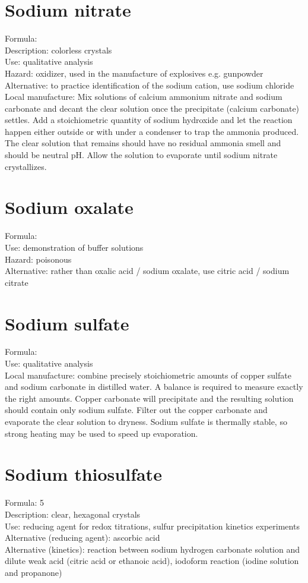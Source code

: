 \section{Sodium nitrate}
Formula: \\
Description: colorless crystals\\
Use: qualitative analysis\\
Hazard: oxidizer, 
used in the manufacture of explosives e.g. 
gunpowder\\
Alternative: to practice identification of the sodium cation, 
use sodium chloride\\
Local manufacture: Mix solutions of calcium ammonium nitrate 
and sodium carbonate and decant the clear solution 
once the precipitate (calcium carbonate) settles. 
Add a stoichiometric quantity of sodium hydroxide 
and let the reaction happen either outside 
or with under a condenser to trap the ammonia produced. 
The clear solution that remains should have no residual ammonia smell 
and should be neutral pH. 
Allow the solution to evaporate until sodium nitrate crystallizes.

\section{Sodium oxalate}
Formula: \\
Use: demonstration of buffer solutions\\
Hazard: poisonous\\
Alternative: rather than oxalic acid / sodium oxalate, 
use citric acid / sodium citrate

\section{Sodium sulfate}
Formula: \\
Use: qualitative analysis\\
Local manufacture: combine precisely stoichiometric amounts 
of copper sulfate and sodium carbonate in distilled water. 
A balance is required to measure exactly the right amounts. 
Copper carbonate will precipitate and the resulting solution 
should contain only sodium sulfate. 
Filter out the copper carbonate and evaporate the clear solution to dryness. 
Sodium sulfate is thermally stable, 
so strong heating may be used to speed up evaporation.

\section{Sodium thiosulfate}
Formula:  5\\
Description: clear, 
hexagonal crystals\\
Use: reducing agent for redox titrations, 
sulfur precipitation kinetics experiments\\
Alternative (reducing agent): ascorbic acid\\
Alternative (kinetics): reaction between sodium hydrogen carbonate solution 
and dilute weak acid (citric acid or ethanoic acid), 
iodoform reaction (iodine solution and propanone)\\

